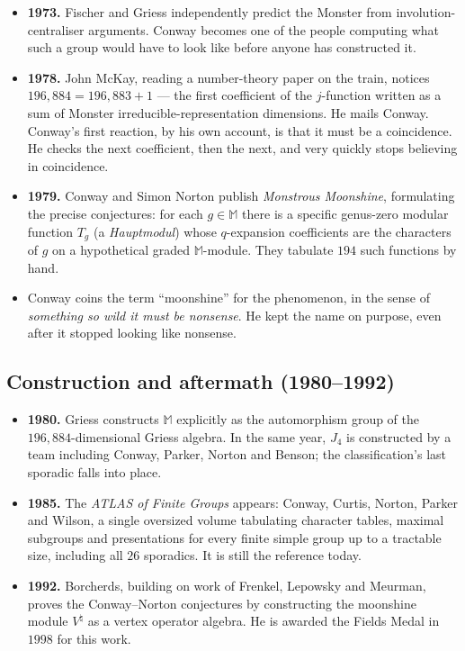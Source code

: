 \documentclass[11pt]{article}
\newcommand{\M}{\mathbb{M}}
\begin{document}
\begin{itemize}[leftmargin=*, itemsep=2pt]
  \item \textbf{1973.} Fischer and Griess independently predict the
        Monster from involution-centraliser arguments. Conway
        becomes one of the people computing what such a group would
        have to look like before anyone has constructed it.
  \item \textbf{1978.} John McKay, reading a number-theory paper on
        the train, notices $196{,}884 = 196{,}883 + 1$ --- the first
        coefficient of the $j$-function written as a sum of Monster
        irreducible-representation dimensions. He mails Conway.
        Conway's first reaction, by his own account, is that it must
        be a coincidence. He checks the next coefficient, then the
        next, and very quickly stops believing in coincidence.
  \item \textbf{1979.} Conway and Simon Norton publish
        \emph{Monstrous Moonshine}, formulating the precise
        conjectures: for each $g \in \M$ there is a specific
        genus-zero modular function $T_g$ (a \emph{Hauptmodul})
        whose $q$-expansion coefficients are the characters of $g$
        on a hypothetical graded $\M$-module. They tabulate $194$
        such functions by hand.
  \item Conway coins the term ``moonshine'' for the phenomenon, in
        the sense of \emph{something so wild it must be nonsense}.
        He kept the name on purpose, even after it stopped looking
        like nonsense.
\end{itemize}

\subsection*{Construction and aftermath (1980--1992)}

\begin{itemize}[leftmargin=*, itemsep=2pt]
  \item \textbf{1980.} Griess constructs $\M$ explicitly as the
        automorphism group of the $196{,}884$-dimensional Griess
        algebra. In the same year, $J_4$ is constructed by a team
        including Conway, Parker, Norton and Benson; the
        classification's last sporadic falls into place.
  \item \textbf{1985.} The \emph{ATLAS of Finite Groups} appears:
        Conway, Curtis, Norton, Parker and Wilson, a single
        oversized volume tabulating character tables, maximal
        subgroups and presentations for every finite simple group up
        to a tractable size, including all $26$ sporadics. It is
        still the reference today.
  \item \textbf{1992.} Borcherds, building on work of Frenkel,
        Lepowsky and Meurman, proves the Conway--Norton conjectures
        by constructing the moonshine module $V^{\natural}$ as a
        vertex operator algebra. He is awarded the Fields Medal in
        $1998$ for this work.
\end{itemize}
\end{document}
